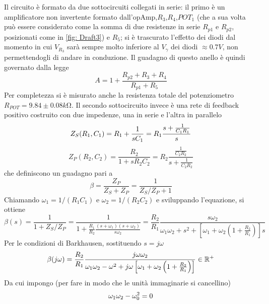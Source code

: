 \documentclass[10pt, a4paper, italian]{article}
\begin{document}
Il circuito è formato da due sottocircuiti collegati in serie: il primo è un amplificatore non invertente formato dall'opAmp,$R_3$,$R_4$,$POT_1$ (che a sua volta può essere considerato come la somma di due resistenze in serie $R_{p1}$ e $R_{p2}$, posizionati come in \cref{fig: Draft3}) e $R_5$; si è trascurato l'effetto dei diodi dal momento in cui $V_{R_3}$ sarà sempre molto inferiore al $V_\gamma$ dei diodi $\approx 0.7 \si{V}$, non permettendogli di andare in conduzione.
Il guadagno di questo anello è quindi governato dalla legge 
\begin{equation}\label{eq: AinPot}
A  = 1 + \frac{R_{p2} + R_3 + R_4}{R_{p1} + R_5}
\end{equation}
Per completezza si è misurato anche la resistenza totale del potenziometro $R_{POT}=9.84 \pm 0.08 \si{k\ohm}$.
Il secondo sottocircuito invece è una rete di feedback positivo costruito con due impedenze, una in serie e l'altra in parallelo
\begin{equation}\label{eq: A}
Z_S (R_1,C_1) = R_1 + \frac{1}{s C_1} = R_1 \frac{s + \frac{1}{C_1 R_1}}{s} \\
\end{equation}
\begin{equation}\label{eq: B}
Z_P (R_2,C_2) = \frac{R_2}{1 + s R_2 C_2} = R_2 \frac{\frac{1}{C_2 R_2}}{s + \frac{1}{C_2 R_2}}
\end{equation}
che definiscono un guadagno pari a
\begin{equation} \label{eq:loop-gain-beta}
\beta = \frac{Z_P}{Z_S + Z_P} = \frac{1}{Z_S/Z_P + 1}
\end{equation}
Chiamando $\omega_1 = 1/(R_1 C_1)$ e $\omega_2 = 1/(R_2 C_2)$ e sviluppando l'equazione, si ottiene
\begin{equation}
\beta(s) = \frac{1}{1 + Z_S/Z_P} =
\frac{1}{1 + \frac{R_1}{R_2} \frac{(s + \omega_1)(s + \omega_2)}{s \omega_2}} =
\frac{R_2}{R_1} \frac{s \omega_2}{\omega_1 \omega_2 + s^2 +
\left[\omega_{1} + \omega_{2} \left(1 + \frac{R_2}{R_{1}}\right)\right] s}
\end{equation}
Per le condizioni di Barkhausen, sostituendo $s = j\omega$
\begin{equation} \label{eq:bark}
\beta(j\omega) = \frac{R_2}{R_1} \frac{j \omega \omega_2}
{\omega_1 \omega_2 - \omega^2 + j \omega
\left[\omega_1 + \omega_2 \left(1 + \frac{R_2}{R_1}\right)\right]} \in \mathbb R^+
\end{equation}
Da cui impongo (per fare in modo che le unità immaginarie si cancellino)
\[
\omega_1 \omega_2 - \omega_0^2 = 0\\
\]
\end{document}
